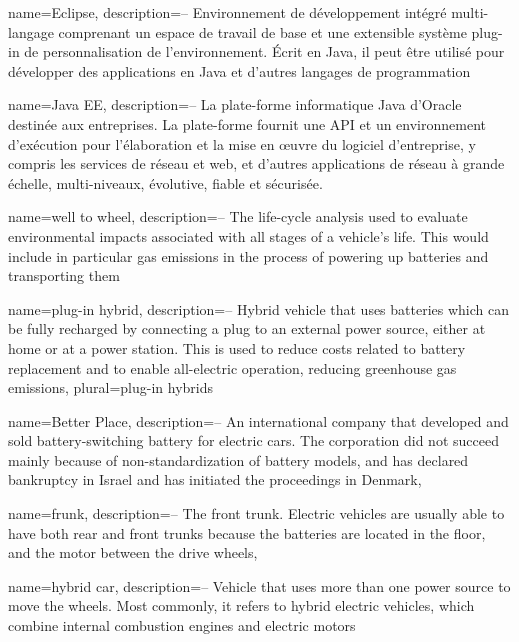 
{
  name=Eclipse,
  description={-- Environnement de développement intégré multi-langage comprenant un espace de travail de base et une extensible système plug-in de personnalisation de l'environnement. Écrit en Java, il peut être utilisé pour développer des applications en Java et d'autres langages de programmation}
}

{
  name=Java EE,
  description={-- La plate-forme informatique Java d'Oracle destinée aux entreprises. La plate-forme fournit une API et un environnement d'exécution pour l'élaboration et la mise en œuvre du logiciel d'entreprise, y compris les services de réseau et web, et d'autres applications de réseau à grande échelle, multi-niveaux, évolutive, fiable et sécurisée.}
}

{
  name=well to wheel,
  description={-- The life-cycle analysis used to evaluate environmental impacts associated with all stages of a vehicle's life. This would include in particular gas emissions in the process of powering up batteries and transporting them}
}

{
  name=plug-in hybrid,
  description={-- Hybrid vehicle that uses batteries which can be fully recharged by connecting a plug to an external power source, either at home or at a power station. This is used to reduce costs related to battery replacement and to enable all-electric operation, reducing greenhouse gas emissions},
  plural=plug-in hybrids
}

{
  name=Better Place,
  description={-- An international company that developed and sold battery-switching battery for electric cars. The corporation did not succeed mainly because of non-standardization of battery models, and has declared bankruptcy in Israel and has initiated the proceedings in Denmark},
}


{
  name=frunk,
  description={-- The front trunk. Electric vehicles are usually able to have both rear and front trunks because the batteries are located in the floor, and the motor between the drive wheels},
}

{
	name=hybrid car,
	description={-- Vehicle that uses more than one power source to move the wheels. Most commonly, it refers to hybrid electric vehicles, which combine internal combustion engines and electric motors}
}

